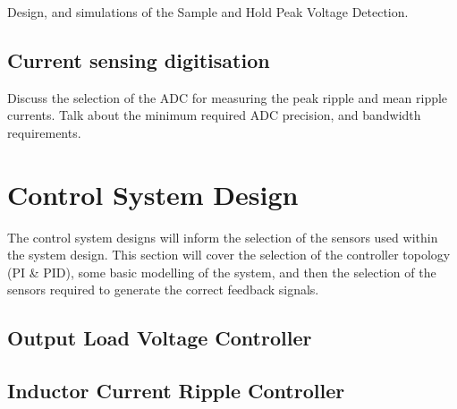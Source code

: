 Design, and simulations of the Sample and Hold Peak Voltage Detection.

\subsection{Current sensing digitisation}\label{S:current_sense_ADC_design}

Discuss the selection of the ADC for measuring the peak ripple and mean ripple currents. Talk about the minimum required ADC precision, and bandwidth requirements.  


%
%

\section{Control System Design}\label{S:control_design}

The control system designs will inform the selection of the sensors used within the system design. This section will cover the selection of the controller topology (PI \& PID), some basic modelling of the system, and then the selection of the sensors required to generate the correct feedback signals. 

\subsection{Output Load Voltage Controller}\label{S:output_control_design}

\subsection{Inductor Current Ripple Controller}\label{S:ripple_control_design}





